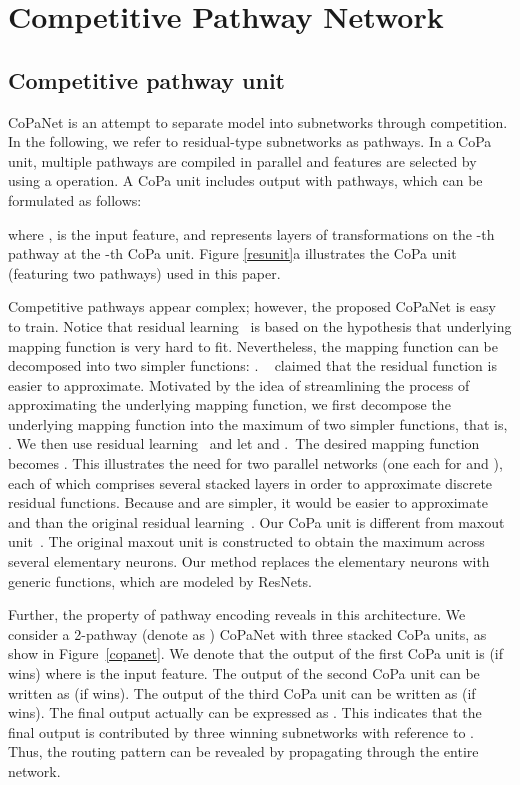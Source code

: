 \documentclass[wcp]{jmlr}
\begin{document}
\section{Competitive Pathway Network}
\subsection{Competitive pathway unit}
CoPaNet is an attempt to separate model into subnetworks through competition.
In the following, we refer to residual-type subnetworks as pathways.
In a CoPa unit, multiple pathways are compiled in parallel and features are selected by using a  operation.
A CoPa unit includes output  with  pathways, which can be formulated as follows:

where ,  is the input feature, and  represents layers of transformations on the -th pathway at the -th CoPa unit. Figure \ref{resunit}a illustrates the CoPa unit (featuring two pathways) used in this paper. 

Competitive pathways appear complex; however, the proposed CoPaNet is easy to train. 
Notice that residual learning~\citep{he2015deep} is based on the hypothesis that underlying mapping function  is very hard to fit.
Nevertheless, the mapping function can be decomposed into two simpler functions: . 
~\cite{he2015deep} claimed that the residual function  is easier to approximate. 
Motivated by the idea of streamlining the process of approximating the underlying mapping function, we first decompose the underlying mapping function into the maximum of two simpler functions, that is, . 
We then use residual learning~\citep{he2015deep} and let  and .\
The desired mapping function becomes . 
This illustrates the need for two parallel networks (one each for  and ), each of which comprises several stacked layers in order to approximate discrete residual functions. 
Because  and  are simpler, it would be easier to approximate  and  than the original residual learning~\citep{he2015deep}.
Our CoPa unit is different from maxout unit~\citep{goodfellow2013maxout}.
The original maxout unit is constructed to obtain the maximum across several elementary neurons.
 Our method replaces the elementary neurons with generic functions, which are modeled by ResNets.

Further, the property of pathway encoding reveals in this architecture.
We consider a 2-pathway (denote as ) CoPaNet with three stacked CoPa units, as show in Figure~\ref{copanet}.
We denote that the output of the first CoPa unit is  (if  wins) where  is the input feature.
The output of the second CoPa unit can be written as  (if  wins).
The output of the third CoPa unit can be written as  (if  wins).
The final output actually can be expressed as .
This indicates that the final output is contributed by three winning subnetworks  with reference to .
Thus, the routing pattern can be revealed by propagating  through the entire network.
\end{document}
